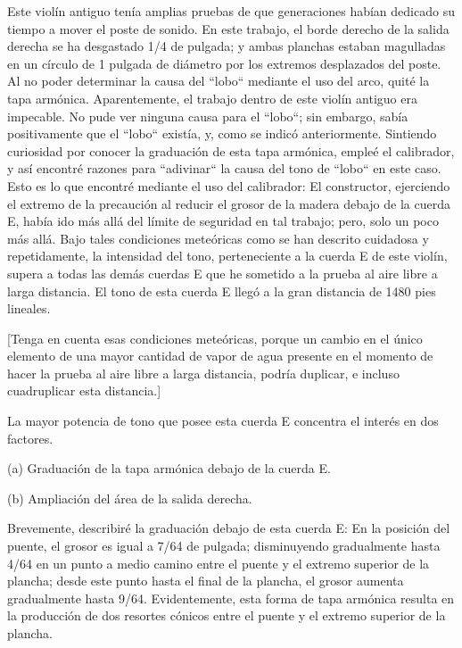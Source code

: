 \documentclass[12pt]{book}
\begin{document}
Este violín antiguo tenía amplias pruebas de que generaciones habían dedicado su tiempo a mover el poste de sonido. En este trabajo, el borde derecho de la salida derecha se ha desgastado 1/4 de pulgada; y ambas planchas estaban magulladas en un círculo de 1 pulgada de diámetro por los extremos desplazados del poste. Al no poder determinar la causa del ``lobo`` mediante el uso del arco, quité la tapa armónica. Aparentemente, el trabajo dentro de este violín antiguo era impecable. No pude ver ninguna causa para el ``lobo``; sin embargo, sabía positivamente que el ``lobo`` existía, y, como se indicó anteriormente. Sintiendo curiosidad por conocer la graduación de esta tapa armónica, empleé el calibrador, y así encontré razones para ``adivinar`` la causa del tono de ``lobo`` en este caso. Esto es lo que encontré mediante el uso del calibrador: El constructor, ejerciendo el extremo de la precaución al reducir el grosor de la madera debajo de la cuerda E, había ido más allá del límite de seguridad en tal trabajo; pero, solo un poco más allá. Bajo tales condiciones meteóricas como se han descrito cuidadosa y repetidamente, la intensidad del tono, perteneciente a la cuerda E de este violín, supera a todas las demás cuerdas E que he sometido a la prueba al aire libre a larga distancia. El tono de esta cuerda E llegó a la gran distancia de 1480 pies lineales.

[Tenga en cuenta esas condiciones meteóricas, porque un cambio en el único elemento de una mayor cantidad de vapor de agua presente en el momento de hacer la prueba al aire libre a larga distancia, podría duplicar, e incluso cuadruplicar esta distancia.]

La mayor potencia de tono que posee esta cuerda E concentra el interés en dos factores.

(a) Graduación de la tapa armónica debajo de la cuerda E.

(b) Ampliación del área de la salida derecha.

Brevemente, describiré la graduación debajo de esta cuerda E: En la posición del puente, el grosor es igual a 7/64 de pulgada; disminuyendo gradualmente hasta 4/64 en un punto a medio camino entre el puente y el extremo superior de la plancha; desde este punto hasta el final de la plancha, el grosor aumenta gradualmente hasta 9/64. Evidentemente, esta forma de tapa armónica resulta en la producción de dos resortes cónicos entre el puente y el extremo superior de la plancha.
\end{document}
